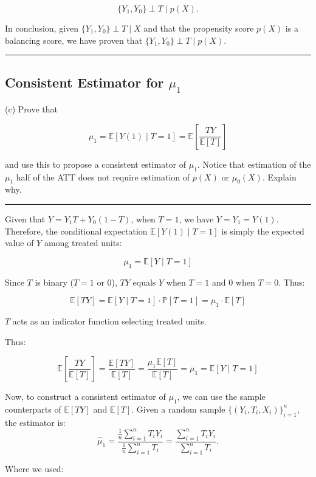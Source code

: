 \documentclass{article}
\newenvironment{colorparagraph}[1]{\par\color{#1}}{\par}
\begin{document}
\[
\{Y_1, Y_0\} \perp T \mid p(X).
\]

In conclusion, given \( \{Y_1, Y_0\} \perp T \mid X \) and that the propensity score \( p(X) \) is a balancing score, we have proven that \( \{Y_1, Y_0\} \perp T \mid p(X) \).

\begin{colorparagraph}{questioncolor}
\rule{\textwidth}{0.5pt}

\label{q2c}\subsection{Consistent Estimator for \( \mu_1 \)}
(c) Prove that 

\[
\mu_1 = \mathbb{E}[Y(1) \mid T = 1] = \mathbb{E} \left[ \frac{TY}{\mathbb{E}[T]} \right]
\]

and use this to propose a consistent estimator of \( \mu_1 \). Notice that estimation of the \( \mu_1 \) half of the ATT does not require estimation of \( p(X) \) or \( \mu_0(X) \). Explain why.

\rule{\textwidth}{0.5pt}
\end{colorparagraph}

Given that $Y = Y_1 T + Y_0 (1 - T)$, when $T = 1$, we have $Y = Y_1 = Y(1)$. Therefore, the conditional expectation $\mathbb{E}[Y(1) \mid T = 1]$ is simply the expected value of $Y$ among treated units:

$$
\mu_1 = \mathbb{E}[Y \mid T = 1]
$$

Since $T$ is binary ($T = 1$ or $0$), $T Y$ equals $Y$ when $T = 1$ and $0$ when $T = 0$. Thus:

$$
\mathbb{E}[T Y] = \mathbb{E}[Y \mid T = 1] \cdot \mathbb{P}[T = 1] = \mu_1 \cdot \mathbb{E}[T]
$$

\(T\) acts as an indicator function selecting treated units.

Thus:

$$
\mathbb{E}\left[ \frac{T Y}{\mathbb{E}[T]} \right]
= \frac{\mathbb{E}[TY]}{\mathbb{E}[T]}
= \frac{\mu_1 \mathbb{E}[T]}{\mathbb{E}[T]}
= \mu_1
= \mathbb{E}[Y \mid T = 1]
$$

Now, to construct a consistent estimator of \(\mu_1\), we can use the sample counterparts of \(\mathbb{E}[T Y]\) and \(\mathbb{E}[T]\). Given a random sample \(\{(Y_i, T_i, X_i)\}_{i=1}^n\), the estimator is:
\[
\hat{\mu}_1 = \frac{\frac{1}{n} \sum_{i=1}^n T_i Y_i}{\frac{1}{n} \sum_{i=1}^n T_i} = \frac{\sum_{i=1}^n T_i Y_i}{\sum_{i=1}^n T_i}.
\]

Where we used:
\end{document}
